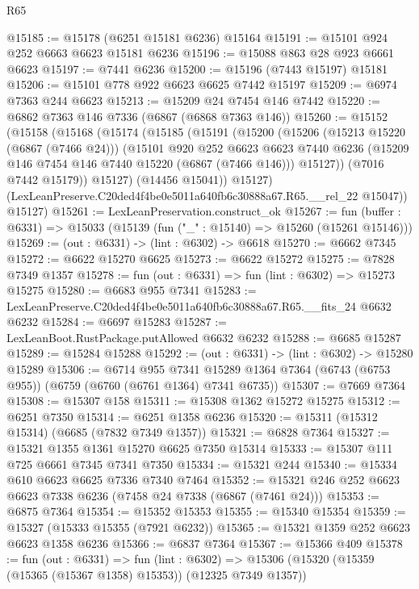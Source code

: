 \begin{lexlean}{R65}
\begin{coremodule}
{@15185 := @15178 (@6251 @15181 @6236) @15164
@15191 := @15101 @924 @252 @6663 @6623 @15181 @6236
@15196 := @15088 @863 @28 @923 @6661 @6623
@15197 := @7441 @6236
@15200 := @15196 (@7443 @15197) @15181
@15206 := @15101 @778 @922 @6623 @6625 @7442 @15197
@15209 := @6974 @7363 @244 @6623
@15213 := @15209 @24 @7454 @146 @7442
@15220 := @6862 @7363 @146 @7336 (@6867 (@6868 @7363 @146))
@15260 := @15152
    (@15158
      (@15168
        (@15174
          (@15185
            (@15191
              (@15200
                (@15206
                  (@15213 @15220 (@6867 (@7466 @24)))
                  (@15101
                    @920
                    @252
                    @6623
                    @6623
                    @7440
                    @6236
                    (@15209 @146 @7454 @146 @7440 @15220 (@6867 (@7466 @146)))
                    @15127))
                (@7016 @7442 @15179))
              @15127)
            (@14456 @15041))
          @15127)
        (LexLeanPreserve.C20ded4f4be0e5011a640fb6c30888a67.R65.__rel_22 @15047))
      @15127)
@15261 := LexLeanPreservation.construct_ok
@15267 := fun (buffer : @6331) => @15033 (@15139 (fun ("_" : @15140) => @15260 (@15261 @15146)))
@15269 := (out : @6331) -> (lint : @6302) -> @6618
@15270 := @6662 @7345
@15272 := @6622 @15270 @6625
@15273 := @6622 @15272
@15275 := @7828 @7349 @1357
@15278 := fun (out : @6331) => fun (lint : @6302) => @15273 @15275
@15280 := @6683 @955 @7341
@15283 := LexLeanPreserve.C20ded4f4be0e5011a640fb6c30888a67.R65.__fits_24 @6632 @6232
@15284 := @6697 @15283
@15287 := LexLeanBoot.RustPackage.putAllowed @6632 @6232
@15288 := @6685 @15287
@15289 := @15284 @15288
@15292 := (out : @6331) -> (lint : @6302) -> @15280 @15289
@15306 := @6714
    @955
    @7341
    @15289
    @1364
    @7364
    (@6743 (@6753 @955))
    (@6759 (@6760 (@6761 @1364) @7341 @6735))
@15307 := @7669 @7364
@15308 := @15307 @158
@15311 := @15308 @1362 @15272 @15275
@15312 := @6251 @7350
@15314 := @6251 @1358 @6236
@15320 := @15311 (@15312 @15314) (@6685 (@7832 @7349 @1357))
@15321 := @6828 @7364
@15327 := @15321 @1355 @1361 @15270 @6625 @7350 @15314
@15333 := @15307 @111 @725 @6661 @7345 @7341 @7350
@15334 := @15321 @244
@15340 := @15334 @610 @6623 @6625 @7336 @7340 @7464
@15352 := @15321 @246 @252 @6623 @6623 @7338 @6236 (@7458 @24 @7338 (@6867 (@7461 @24)))
@15353 := @6875 @7364
@15354 := @15352 @15353
@15355 := @15340 @15354
@15359 := @15327 (@15333 @15355 (@7921 @6232))
@15365 := @15321 @1359 @252 @6623 @6623 @1358 @6236
@15366 := @6837 @7364
@15367 := @15366 @409
@15378 := fun (out : @6331) =>
  fun (lint : @6302) => @15306 (@15320 (@15359 (@15365 (@15367 @1358) @15353)) (@12325 @7349 @1357))
}
\end{coremodule}
\end{lexlean}
